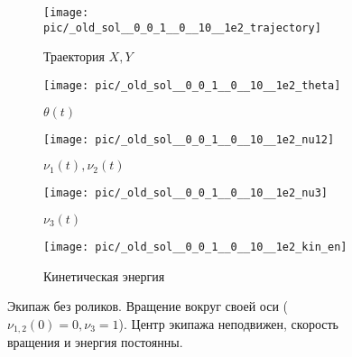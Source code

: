 \begin{figure}
    \centering
    \begin{subfigure}[t]{0.3\textwidth}
        \centering
        \texttt{[image: pic/\_old\_sol\_\_0\_0\_1\_\_0\_\_10\_\_1e2\_trajectory]}
        \caption{Траектория $X, Y$}
        \label{fig:_old_sol__0_0_1__0__10__1e2_trajectory}
    \end{subfigure}
    \begin{subfigure}[t]{0.3\textwidth}
        \centering
        \texttt{[image: pic/\_old\_sol\_\_0\_0\_1\_\_0\_\_10\_\_1e2\_theta]}
        \caption{$\theta(t)$}
        \label{fig:_old_sol__0_0_1__0__10__1e2_theta}
    \end{subfigure}
    \vspace{12pt}
    
    \begin{subfigure}[t]{0.3\textwidth}
        \centering
        \texttt{[image: pic/\_old\_sol\_\_0\_0\_1\_\_0\_\_10\_\_1e2\_nu12]}
        \caption{$\nu_1(t), \nu_2(t)$}
        \label{fig:_old_sol__0_0_1__0__10__1e2_nu12}    
    \end{subfigure}
    \hfill
    \begin{subfigure}[t]{0.3\textwidth}
        \centering
        \texttt{[image: pic/\_old\_sol\_\_0\_0\_1\_\_0\_\_10\_\_1e2\_nu3]} \\
        \caption{$\nu_3(t)$}
        \label{fig:_old_sol__0_0_1__0__10__1e2_nu3}
    \end{subfigure}
    \hfill
    \begin{subfigure}[t]{0.3\textwidth}
        \centering
        \texttt{[image: pic/\_old\_sol\_\_0\_0\_1\_\_0\_\_10\_\_1e2\_kin\_en]}
        \caption{Кинетическая энергия}
        \label{fig:_old_sol__0_0_1__0__10__1e2_kin_en}
    \end{subfigure}
    
    \caption{Экипаж без роликов. Вращение вокруг своей оси ($\nu_{1,2}(0) = 0, \nu_3 = 1$). Центр экипажа неподвижен, скорость вращения и энергия постоянны.}
    \label{fig:old_selfrot}
\end{figure}